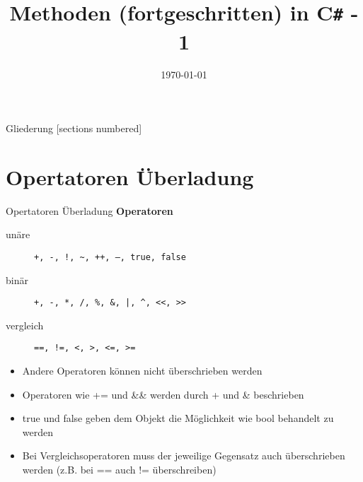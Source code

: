 



\title{Methoden (fortgeschritten) in C\texttt{\#} - 1}
\date{\today}




\maketitle

\begin{frame}{Gliederung}
	[sections numbered]
	\tableofcontents
\end{frame}

\section{Opertatoren Überladung}
\begin{frame}{Opertatoren Überladung}
	\textbf{Operatoren}\\
	\begin{description}
		\item[unäre] \texttt{\alert{+}, \alert{-}, \alert{!}, \alert{\texttt{\~}}, \alert{++}, \alert{--}, \alert{true}, \alert{false}}
		\item[binär] \texttt{\alert{+}, \alert{-}, \alert{*}, \alert{/}, \alert{\%}, \alert{\&}, \alert{|}, \alert{\texttt{\^}}, \alert{<<}, \alert{>>}}
		\item[vergleich]  \texttt{\alert{==}, \alert{!=}, \alert{<}, \alert{>}, \alert{<=}, \alert{>=}}
	\end{description}
	\begin{itemize}
		\item Andere Operatoren können nicht überschrieben werden
		\item Operatoren wie \alert{+=} und \alert{\&\&} werden durch \alert{+} und \alert{\&} beschrieben
		\item \alert{true} und \alert{false} geben dem Objekt die Möglichkeit wie bool behandelt zu werden
		\item Bei Vergleichsoperatoren muss der jeweilige Gegensatz auch überschrieben werden (z.B. bei \alert{==} auch \alert{!=} überschreiben)
	\end{itemize}
\end{frame}

